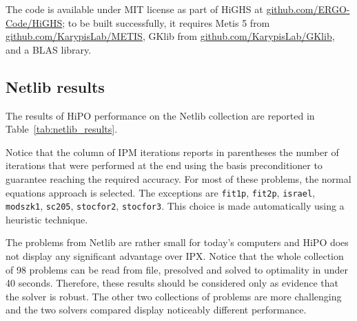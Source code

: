 \documentclass[a4paper]{article}
\newcommand{\0}{\mathbf 0}
\begin{document}
The code is available under MIT license as part of HiGHS at \url{github.com/ERGO-Code/HiGHS}; to be built successfully, it requires Metis 5 from \url{github.com/KarypisLab/METIS}, GKlib from \url{github.com/KarypisLab/GKlib}, and a BLAS library.

\subsection{Netlib results}
The results of HiPO performance on the Netlib collection are reported in Table~\ref{tab:netlib_results}.

Notice that the column of IPM iterations reports in parentheses the number of iterations that were performed at the end using the basis preconditioner to guarantee reaching the required accuracy. 
For most of these problems, the normal equations approach is selected. The exceptions are \texttt{fit1p}, \texttt{fit2p}, \texttt{israel}, \texttt{modszk1}, \texttt{sc205}, \texttt{stocfor2}, \texttt{stocfor3}. This choice is made automatically using a heuristic technique.

The problems from Netlib are rather small for today's computers and HiPO does not display any significant advantage over IPX. Notice that the whole collection of 98 problems can be read from file, presolved and solved to optimality in under 40 seconds. Therefore, these results should be considered only as evidence that the solver is robust. The other two collections of problems are more challenging and the two solvers compared display noticeably different performance.
\end{document}
